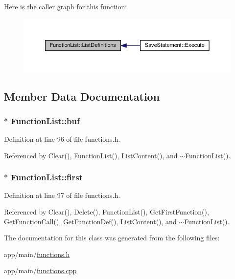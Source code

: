 Here is the caller graph for this function\+:\nopagebreak
\begin{figure}[H]
\begin{center}
\leavevmode
\includegraphics[width=350pt]{classFunctionList_af69593a40790f4d696a74e46c3c9e552_icgraph}
\end{center}
\end{figure}




\subsection{Member Data Documentation}
\subsubsection[{\texorpdfstring{buf}{buf}}]{$\ast$ Function\+List\+::buf\hspace{0.3cm}{\ttfamily [private]}}\hypertarget{classFunctionList_aa69c3feda1c4a6133fe821982b418c39}{}\label{classFunctionList_aa69c3feda1c4a6133fe821982b418c39}


Definition at line 96 of file functions.\+h.



Referenced by Clear(), Function\+List(), List\+Content(), and $\sim$\+Function\+List().

\subsubsection[{\texorpdfstring{first}{first}}]{$\ast$ Function\+List\+::first\hspace{0.3cm}{\ttfamily [private]}}\hypertarget{classFunctionList_a4a0534f4240022c58c3e06234e7f9f99}{}\label{classFunctionList_a4a0534f4240022c58c3e06234e7f9f99}


Definition at line 97 of file functions.\+h.



Referenced by Clear(), Delete(), Function\+List(), Get\+First\+Function(), Get\+Function\+Call(), Get\+Function\+Def(), List\+Content(), and $\sim$\+Function\+List().



The documentation for this class was generated from the following files\+:\begin{DoxyCompactItemize}
\item 
app/main/\hyperlink{functions_8h}{functions.\+h}\item 
app/main/\hyperlink{functions_8cpp}{functions.\+cpp}\end{DoxyCompactItemize}
